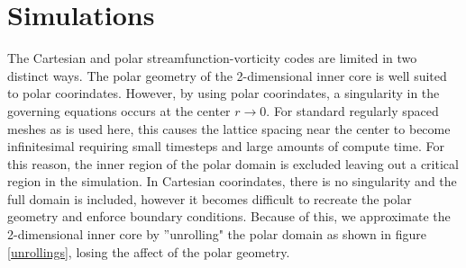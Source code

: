 \documentclass{article}
\begin{document}
\section*{Simulations}

The Cartesian and polar streamfunction-vorticity codes are limited in two 
distinct ways. The polar geometry of the 2-dimensional inner core is well 
suited to polar coorindates. However, by using polar coorindates, a 
singularity in the governing equations occurs at the center 
$r \rightarrow 0$. For standard regularly spaced meshes as is used here, 
this causes the lattice spacing near the center to become infinitesimal 
requiring small timesteps and large amounts of compute time. For this 
reason, the inner region of the polar domain is excluded leaving out a 
critical region in the simulation. In Cartesian coorindates, there is no 
singularity and the full domain is included, however it becomes difficult 
to recreate the polar geometry and enforce boundary conditions. Because of 
this, we approximate the 2-dimensional inner core by ''unrolling" the polar domain as shown in figure 
\ref{unrollings}, losing the affect of the polar geometry.
\end{document}
